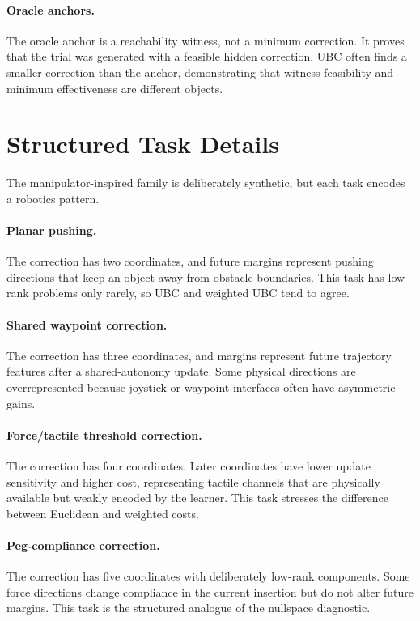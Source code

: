 \documentclass{article}
\begin{document}
\paragraph{Oracle anchors.}
The oracle anchor is a reachability witness, not a minimum correction. It proves
that the trial was generated with a feasible hidden correction. UBC often finds
a smaller correction than the anchor, demonstrating that witness feasibility and
minimum effectiveness are different objects.

\section{Structured Task Details}

The manipulator-inspired family is deliberately synthetic, but each task encodes
a robotics pattern.

\paragraph{Planar pushing.}
The correction has two coordinates, and future margins represent pushing
directions that keep an object away from obstacle boundaries. This task has low
rank problems only rarely, so UBC and weighted UBC tend to agree.

\paragraph{Shared waypoint correction.}
The correction has three coordinates, and margins represent future trajectory
features after a shared-autonomy update. Some physical directions are
overrepresented because joystick or waypoint interfaces often have asymmetric
gains.

\paragraph{Force/tactile threshold correction.}
The correction has four coordinates. Later coordinates have lower update
sensitivity and higher cost, representing tactile channels that are physically
available but weakly encoded by the learner. This task stresses the difference
between Euclidean and weighted costs.

\paragraph{Peg-compliance correction.}
The correction has five coordinates with deliberately low-rank components.
Some force directions change compliance in the current insertion but do not
alter future margins. This task is the structured analogue of the nullspace
diagnostic.
\end{document}
